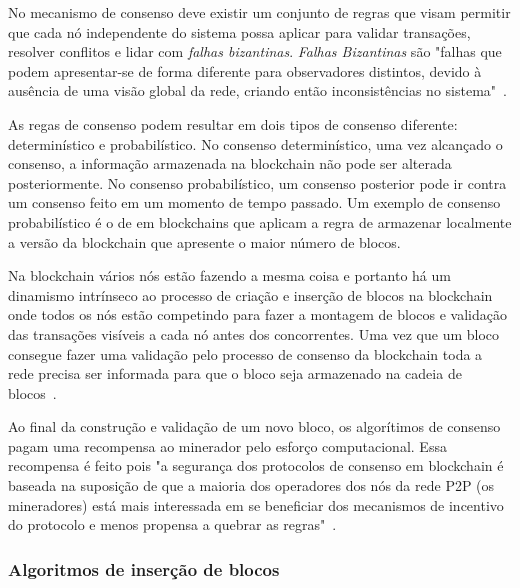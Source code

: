 \documentclass[12pt]{article}
\begin{document}
No mecanismo de consenso deve existir um conjunto de regras que visam permitir que cada nó independente do sistema possa aplicar para validar transações, resolver conflitos e lidar com \emph{falhas bizantinas}. \emph{Falhas Bizantinas} são "falhas que podem apresentar-se de forma diferente para observadores distintos, devido à ausência de uma visão global da rede, criando então inconsistências no sistema"~\cite{miers2019analise}.

As regas de consenso podem resultar em dois tipos de consenso diferente: determinístico e probabilístico. No consenso determinístico, uma vez alcançado o consenso, a informação armazenada na blockchain não pode ser alterada posteriormente. No consenso probabilístico, um consenso posterior pode ir contra um consenso feito em um momento de tempo passado. Um exemplo de consenso probabilístico é o de em blockchains que aplicam a regra de armazenar localmente a versão da blockchain que apresente o maior número de blocos.

Na blockchain vários nós estão fazendo a mesma coisa e portanto há um dinamismo intrínseco ao processo de criação e inserção de blocos na blockchain onde todos os nós estão competindo para fazer a montagem de blocos e validação das transações visíveis a cada nó antes dos concorrentes. Uma vez que um bloco consegue fazer uma validação pelo processo de consenso da blockchain toda a rede precisa ser informada para que o bloco seja armazenado na cadeia de blocos~\cite{braga2017segurancca}.

Ao final da construção e validação de um novo bloco, os algorítimos de consenso pagam uma recompensa ao minerador pelo esforço computacional. Essa recompensa é feito pois "a segurança dos protocolos de consenso em blockchain é baseada na suposição de que a maioria dos operadores dos nós da rede P2P (os mineradores) está mais interessada em se beneficiar dos mecanismos de incentivo do protocolo e menos propensa a quebrar as regras"~\cite{braga2017segurancca}.

\subsubsection{Algoritmos de inserção de blocos}
\end{document}
